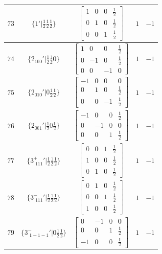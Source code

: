 \documentclass[fleqn,8pt]{jsarticle}
\begin{document}
\begin{longtable}{ccccc}
$ 73 $ & $ \{1{}'|\frac{1}{2} \frac{1}{2} \frac{1}{2}\} $ & $ \begin{bmatrix} 1 & 0 & 0 & \frac{1}{2} \\ 0 & 1 & 0 & \frac{1}{2} \\ 0 & 0 & 1 & \frac{1}{2} \end{bmatrix} $ & $ 1 $ & $ -1 $ \\ \hline
$ 74 $ & $ \{2{}_{100}{}'|\frac{1}{2} \frac{1}{2} 0\} $ & $ \begin{bmatrix} 1 & 0 & 0 & \frac{1}{2} \\ 0 & -1 & 0 & \frac{1}{2} \\ 0 & 0 & -1 & 0 \end{bmatrix} $ & $ 1 $ & $ -1 $ \\ \hline
$ 75 $ & $ \{2{}_{010}{}'|0 \frac{1}{2} \frac{1}{2}\} $ & $ \begin{bmatrix} -1 & 0 & 0 & 0 \\ 0 & 1 & 0 & \frac{1}{2} \\ 0 & 0 & -1 & \frac{1}{2} \end{bmatrix} $ & $ 1 $ & $ -1 $ \\ \hline
$ 76 $ & $ \{2{}_{001}{}'|\frac{1}{2} 0 \frac{1}{2}\} $ & $ \begin{bmatrix} -1 & 0 & 0 & \frac{1}{2} \\ 0 & -1 & 0 & 0 \\ 0 & 0 & 1 & \frac{1}{2} \end{bmatrix} $ & $ 1 $ & $ -1 $ \\ \hline
$ 77 $ & $ \{3^{+}_{\,\,111}{}'|\frac{1}{2} \frac{1}{2} \frac{1}{2}\} $ & $ \begin{bmatrix} 0 & 0 & 1 & \frac{1}{2} \\ 1 & 0 & 0 & \frac{1}{2} \\ 0 & 1 & 0 & \frac{1}{2} \end{bmatrix} $ & $ 1 $ & $ -1 $ \\ \hline
$ 78 $ & $ \{3^{-}_{\,\,111}{}'|\frac{1}{2} \frac{1}{2} \frac{1}{2}\} $ & $ \begin{bmatrix} 0 & 1 & 0 & \frac{1}{2} \\ 0 & 0 & 1 & \frac{1}{2} \\ 1 & 0 & 0 & \frac{1}{2} \end{bmatrix} $ & $ 1 $ & $ -1 $ \\ \hline
$ 79 $ & $ \{3^{-}_{\,\,1-1-1}{}'|0 \frac{1}{2} \frac{1}{2}\} $ & $ \begin{bmatrix} 0 & -1 & 0 & 0 \\ 0 & 0 & 1 & \frac{1}{2} \\ -1 & 0 & 0 & \frac{1}{2} \end{bmatrix} $ & $ 1 $ & $ -1 $ \\ \hline

\end{longtable}
\end{document}
